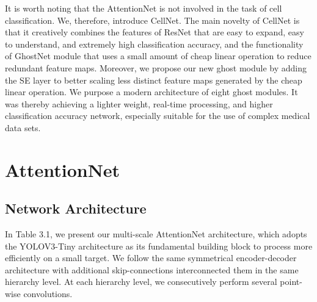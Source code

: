 It is worth noting that the AttentionNet is not involved in the task of cell classification. We, therefore, introduce CellNet. The main novelty of CellNet is that it creatively combines the features of ResNet\cite{20} that are easy to expand, easy to understand, and extremely high classification accuracy, and the functionality of GhostNet\cite{19} module that uses a small amount of cheap linear operation to reduce redundant feature maps. Moreover, we propose our new ghost module by adding the SE layer to better scaling less distinct feature maps generated by the cheap linear operation. We purpose a modern architecture of eight ghost modules. It was thereby achieving a lighter weight, real-time processing, and higher classification accuracy network, especially suitable for the use of complex medical data sets.


\section{AttentionNet}
\label{sec:lorem}


\subsection{Network Architecture} %
\label{sub:citations}

In Table 3.1, we present our multi-scale AttentionNet architecture, which adopts the YOLOV3-Tiny architecture as its fundamental building block to process more efficiently on a small target. We follow the same
symmetrical encoder-decoder architecture with additional skip-connections interconnected them in the same hierarchy level. At each hierarchy level, we consecutively perform several point-wise convolutions. 

